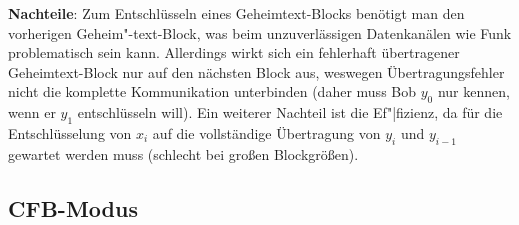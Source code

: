 \textbf{Nachteile}:
Zum Entschlüsseln eines Geheimtext-Blocks benötigt man den vorherigen Geheim"-text-Block,
was beim unzuverlässigen Datenkanälen wie Funk problematisch sein kann.
Allerdings wirkt sich ein fehlerhaft übertragener Geheimtext-Block nur auf den nächsten Block aus,
weswegen Übertragungsfehler nicht die komplette Kommunikation unterbinden
(daher muss Bob $y_0$ nur kennen, wenn er $y_1$ entschlüsseln will).
Ein weiterer Nachteil ist die Ef"|fizienz, da für die Entschlüsselung von $x_i$ auf die
vollständige Übertragung von $y_i$ und $y_{i-1}$ gewartet werden muss
(schlecht bei großen Blockgrößen).

\pagebreak

\subsection{%
    CFB-Modus%
}

